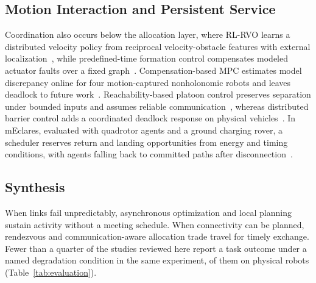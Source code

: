\subsection{Motion Interaction and Persistent Service}

Coordination also occurs below the allocation layer, where RL-RVO learns a distributed velocity policy from reciprocal velocity-obstacle features with external localization~\cite{P_M38}, while predefined-time formation control compensates modeled actuator faults over a fixed graph~\cite{P_X13}. Compensation-based MPC estimates model discrepancy online for four motion-captured nonholonomic robots and leaves deadlock to future work~\cite{P_R17}. Reachability-based platoon control preserves separation under bounded inputs and assumes reliable communication~\cite{P_S04}, whereas distributed barrier control adds a coordinated deadlock response on physical vehicles~\cite{P_S06}. In mEclares, evaluated with quadrotor agents and a ground charging rover, a scheduler reserves return and landing opportunities from energy and timing conditions, with agents falling back to committed paths after disconnection~\cite{P_E57}.

\subsection{Synthesis}
\label{sec:multi-synthesis}

When links fail unpredictably, asynchronous optimization and local planning sustain activity without a meeting schedule. When connectivity can be planned, rendezvous and communication-aware allocation trade travel for timely exchange. Fewer than a quarter of the studies reviewed here report a task outcome under a named degradation condition in the same experiment, \MrcPhysSameCount{} of them on physical robots (Table~\ref{tab:evaluation}).
